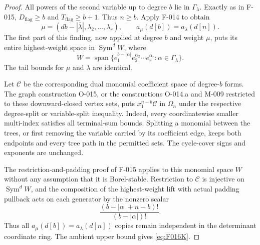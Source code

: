 \begin{proof}
All powers of the second variable up to degree \(b\) lie
in \(\Gamma_\lambda\). Exactly as in F-015,
\(D_{\mathrm{flag}}\geq b\) and
\(T_{\mathrm{flag}}\geq b+1\). Thus \(n\geq b\).
Apply F-014 to obtain
\[
 \mu=(db-|\bar\lambda|,\lambda_2,\ldots,\lambda_r),
                 \qquad a_\mu(d[b])=a_\lambda(d[n]).
\]
The first part of this finding, now applied at degree \(b\)
and weight \(\mu\), puts its entire highest-weight space
in \(\operatorname{Sym}^d W\), where
\[
 W=\operatorname{span}
      \{e_1^{b-|\alpha|}e_2^{\alpha_2}\cdots e_r^{\alpha_r}:
                                        \alpha\in\Gamma_\lambda\}.
\]
The tail bounds for \(\mu\) and \(\lambda\) are identical.

Let \(\mathcal C\) be the corresponding dual monomial
coefficient space of degree-\(b\) forms. The graph construction
O-015, or the constructions O-014.a and M-009 restricted to
these downward-closed vertex sets, puts
\(x_1^{n-b}\mathcal C\) in \(\Omega_n\) under the respective
degree-split or variable-split inequality. Indeed, every
coordinatewise smaller multi-index satisfies all terminal-sum
bounds. Splitting a monomial between the trees, or first
removing the variable carried by its coefficient edge, keeps
both endpoints and every tree path in the permitted sets.
The cycle-cover signs and exponents are unchanged.

The restriction-and-padding proof of F-015 applies to this
monomial space \(W\) without any assumption that it is
Borel-stable. Restriction to \(\mathcal C\) is injective
on \(\operatorname{Sym}^d W\), and the composition of the
highest-weight lift with actual padding pullback acts on each
generator by the nonzero scalar
\[
                       \frac{(b-|\alpha|+n-b)!}
                            {(b-|\alpha|)!}.
\]
Thus all \(a_\mu(d[b])=a_\lambda(d[n])\) copies remain
independent in the determinant coordinate ring. The ambient
upper bound gives \eqref{eq:F016K}.
\end{proof}

